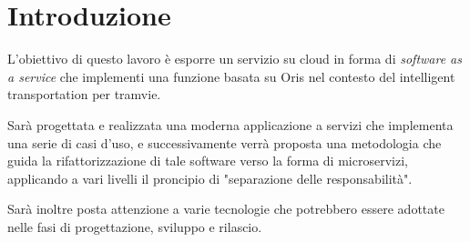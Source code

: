 \chapter{Introduzione}\label{ch:introduzione}
L'obiettivo di questo lavoro è esporre un servizio su cloud in forma di \textit{software as a service} che implementi una 
funzione basata su Oris nel contesto del intelligent transportation per tramvie.

Sarà progettata e realizzata una moderna applicazione a servizi che implementa una serie di casi d'uso, e successivamente verrà proposta una metodologia che guida la rifattorizzazione di tale software verso la forma di microservizi, applicando a vari livelli il proncipio di "separazione delle responsabilità".

Sarà inoltre posta attenzione a varie tecnologie che potrebbero essere adottate nelle fasi di progettazione, sviluppo e rilascio.